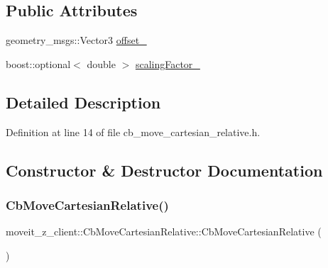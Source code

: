 \subsection*{Public Attributes}
\begin{DoxyCompactItemize}
\item 
geometry\+\_\+msgs\+::\+Vector3 \hyperlink{classmoveit__z__client_1_1CbMoveCartesianRelative_aa5316f2f734336722a353a8e9addea95}{offset\+\_\+}
\item 
boost\+::optional$<$ double $>$ \hyperlink{classmoveit__z__client_1_1CbMoveCartesianRelative_a0d483fda685fe6ef7e68240ae5b2140d}{scaling\+Factor\+\_\+}
\end{DoxyCompactItemize}


\subsection{Detailed Description}


Definition at line 14 of file cb\+\_\+move\+\_\+cartesian\+\_\+relative.\+h.



\subsection{Constructor \& Destructor Documentation}
\mbox{\label{classmoveit__z__client_1_1CbMoveCartesianRelative_a5c8cc24c13c1b440cd3ee7cdb26ec7e2}} 
\subsubsection{\texorpdfstring{Cb\+Move\+Cartesian\+Relative()}{CbMoveCartesianRelative()}\hspace{0.1cm}{\footnotesize\ttfamily [1/2]}}
{\footnotesize\ttfamily moveit\+\_\+z\+\_\+client\+::\+Cb\+Move\+Cartesian\+Relative\+::\+Cb\+Move\+Cartesian\+Relative (\begin{DoxyParamCaption}{ }\end{DoxyParamCaption})}



